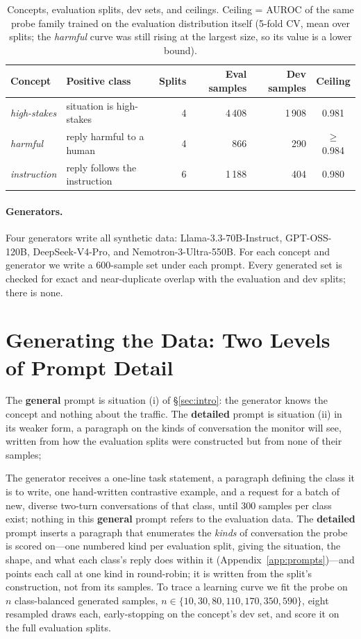 \documentclass{article} %
\newcommand{\hs}{\emph{high-stakes}}
\newcommand{\harm}{\emph{harmful}}
\newcommand{\instr}{\emph{instruction}}
\begin{document}
\begin{table}[t]
  \caption{Concepts, evaluation splits, dev sets, and ceilings. Ceiling = AUROC of the same probe family trained on the evaluation distribution itself (5-fold CV, mean over splits; the \harm{} curve was still rising at the largest size, so its value is a lower bound).}
  \label{tab:splits}
  \centering\small
  \setlength{\tabcolsep}{4pt}
  \begin{tabular}{llrrrc}
    \toprule
    Concept & Positive class & Splits & Eval samples & Dev samples & Ceiling \\
    \midrule
    \hs{} & situation is high-stakes & 4 & 4\,408 & 1\,908 & 0.981 \\
    \harm{} & reply harmful to a human & 4 & 866 & 290 & $\ge$0.984 \\
    \instr{} & reply follows the instruction & 6 & 1\,188 & 404 & 0.980 \\
    \bottomrule
  \end{tabular}
\end{table}

\paragraph{Generators.}
Four generators write all synthetic data: Llama-3.3-70B-Instruct, GPT-OSS-120B, DeepSeek-V4-Pro, and Nemotron-3-Ultra-550B. For each concept and generator we write a 600-sample set under each prompt. Every generated set is checked for exact and near-duplicate overlap with the evaluation and dev splits; there is none.

\section{Generating the Data: Two Levels of Prompt Detail}
\label{sec:methods}
\label{sec:direct}
The \textbf{general} prompt is situation (i) of \S\ref{sec:intro}: the generator knows the concept and nothing about the traffic. The \textbf{detailed} prompt is situation (ii) in its weaker form, a paragraph on the kinds of conversation the monitor will see, written from how the evaluation splits were constructed but from none of their samples;

The generator receives a one-line task statement, a paragraph defining the class it is to write, one hand-written contrastive example, and a request for a batch of new, diverse two-turn conversations of that class, until 300 samples per class exist; nothing in this \textbf{general} prompt refers to the evaluation data. The \textbf{detailed} prompt inserts a paragraph that enumerates the \emph{kinds} of conversation the probe is scored on---one numbered kind per evaluation split, giving the situation, the shape, and what each class's reply does within it (Appendix~\ref{app:prompts})---and points each call at one kind in round-robin; it is written from the split's construction, not from its samples. To trace a learning curve we fit the probe on $n$ class-balanced generated samples, $n\in\{10,30,80,110,170,350,590\}$, eight resampled draws each, early-stopping on the concept's dev set, and score it on the full evaluation splits.
\end{document}
